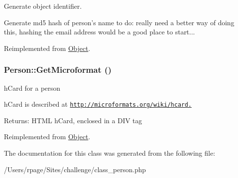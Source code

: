 Generate object identifier. 

Generate md5 hash of person's name to do: really need a better way of doing this, hashing the email address would be a good place to start... 

Reimplemented from \hyperlink{class_object_291597e1743bd57c40b8b49ae676e940}{Object}.\hypertarget{class_person_706e157885b1f1251a3c9be6992cea66}{
\subsubsection{\setlength{\rightskip}{0pt plus 5cm}Person::GetMicroformat ()}}
\label{class_person_706e157885b1f1251a3c9be6992cea66}


hCard for a person 

hCard is described at \href{http://microformats.org/wiki/hcard.}{\tt http://microformats.org/wiki/hcard.}

\begin{Desc}
\item[Returns:]HTML hCard, enclosed in a DIV tag \end{Desc}


Reimplemented from \hyperlink{class_object_28c07f4c361d113e21a934718c1edcc5}{Object}.

The documentation for this class was generated from the following file:\begin{CompactItemize}
\item 
/Users/rpage/Sites/challenge/class\_\-person.php\end{CompactItemize}
